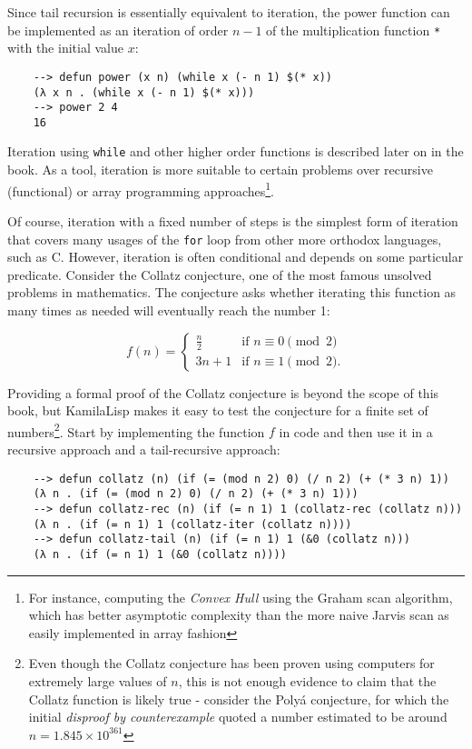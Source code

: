 Since tail recursion is essentially equivalent to iteration, the power function can be implemented as an iteration of order $n-1$ of the multiplication function \verb|*| with the initial value $x$:

\begin{Verbatim}
    --> defun power (x n) (while x (- n 1) $(* x))
    (λ x n . (while x (- n 1) $(* x)))
    --> power 2 4
    16
\end{Verbatim}

Iteration using \verb|while| and other higher order functions is described later on in the book. As a tool, iteration is more suitable to certain problems over recursive (functional) or array programming approaches\footnote{For instance, computing the \textit{Convex Hull} using the Graham scan algorithm, which has better asymptotic complexity than the more naive Jarvis scan as easily implemented in array fashion}.

Of course, iteration with a fixed number of steps is the simplest form of iteration that covers many usages of the \verb|for| loop from other more orthodox languages, such as C. However, iteration is often conditional and depends on some particular predicate. Consider the Collatz conjecture, one of the most famous unsolved problems in mathematics. The conjecture asks whether iterating this function as many times as needed will eventually reach the number 1:

\begin{equation*}
    f(n)={\begin{cases}{\frac {n}{2}}&{\text{if }}n\equiv 0{\pmod {2}}\\[4px]3n+1&{\text{if }}n\equiv 1{\pmod {2}}.\end{cases}}
\end{equation*}

Providing a formal proof of the Collatz conjecture is beyond the scope of this book, but KamilaLisp makes it easy to test the conjecture for a finite set of numbers\footnote{Even though the Collatz conjecture has been proven using computers for extremely large values of $n$, this is not enough evidence to claim that the Collatz function is likely true - consider the Polyá conjecture, for which the initial \textit{disproof by counterexample} quoted a number estimated to be around $n = 1.845 \times 10^{361}$}. Start by implementing the function $f$ in code and then use it in a recursive approach and a tail-recursive approach:

\begin{Verbatim}
    --> defun collatz (n) (if (= (mod n 2) 0) (/ n 2) (+ (* 3 n) 1))
    (λ n . (if (= (mod n 2) 0) (/ n 2) (+ (* 3 n) 1)))
    --> defun collatz-rec (n) (if (= n 1) 1 (collatz-rec (collatz n)))
    (λ n . (if (= n 1) 1 (collatz-iter (collatz n))))
    --> defun collatz-tail (n) (if (= n 1) 1 (&0 (collatz n)))
    (λ n . (if (= n 1) 1 (&0 (collatz n))))
\end{Verbatim}

